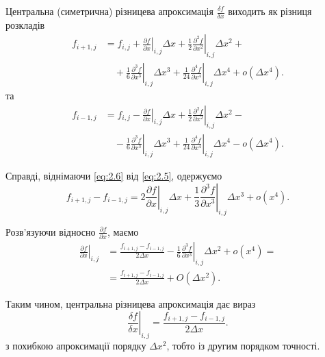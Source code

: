 Центральна (симетрична) різницева апроксимація $\frac{\delta f}{\delta x}$ виходить як різниця розкладів
\begin{equation}
    \label{eq:2.5}
    \begin{aligned}
        f_{i + 1, j} &= f_{i, j} + \left. \frac{\partial f}{\partial x} \right|_{i, j} \Delta x + \frac{1}{2} \left. \frac{\partial^2 f}{\partial x^2} \right|_{i, j} \Delta x^2 + \\ 
        &\quad + \frac{1}{6} \left. \frac{\partial^3 f}{\partial x^3} \right|_{i, j} \Delta x^3 + \frac{1}{24} \left. \frac{\partial^4 f}{\partial x^4} \right|_{i, j} \Delta x^4 + o(\Delta x^4).
    \end{aligned}
\end{equation}
та
\begin{equation}
    \label{eq:2.6}
    \begin{aligned}
        f_{i - 1, j} &= f_{i, j} - \left. \frac{\partial f}{\partial x} \right|_{i, j} \Delta x + \frac{1}{2} \left. \frac{\partial^2 f}{\partial x^2} \right|_{i, j} \Delta x^2 - \\ 
        &\quad - \frac{1}{6} \left. \frac{\partial^3 f}{\partial x^3} \right|_{i, j} \Delta x^3 + \frac{1}{24} \left. \frac{\partial^4 f}{\partial x^4} \right|_{i, j} \Delta x^4 - o(\Delta x^4).
    \end{aligned}
\end{equation}

Справді, віднімаючи \eqref{eq:2.6} від \eqref{eq:2.5}, одержуємо
\begin{equation*}
    f_{i + 1, j} - f_{i - 1, j} = 2 \left. \frac{\partial f}{\partial x} \right|_{i, j} \Delta x + \frac{1}{3} \left. \frac{\partial^3 f}{\partial x^3} \right|_{i, j} \Delta x^3 + o(x^4).
\end{equation*}

Розв'язуючи відносно $\frac{\partial f}{\partial x}$, маємо
\begin{equation}
    \label{eq:2.7}
    \begin{aligned}
        \left. \frac{\partial f}{\partial x} \right|_{i, j} &= \frac{f_{i + 1, j} - f_{i - 1, j}}{2\Delta x} - \frac{1}{6} \left. \frac{\partial^3 f}{\partial x^3} \right|_{i, j} \Delta x^2 + o(x^4) = \\
        &= \frac{f_{i + 1, j} - f_{i - 1, j}}{2\Delta x} + O(\Delta x^2).
    \end{aligned}
\end{equation}

\begin{th_formula}
    Таким чином, центральна різницева апроксимація дає вираз
    \begin{equation}
        \label{eq:2.8}
        \left. \frac{\delta f}{\delta x} \right|_{i, j} = \frac{f_{i + 1, j} - f_{i - 1, j}}{2\Delta x}.
    \end{equation}
    з похибкою апроксимації порядку $\Delta x^2$, тобто із другим порядком точності.
\end{th_formula}

